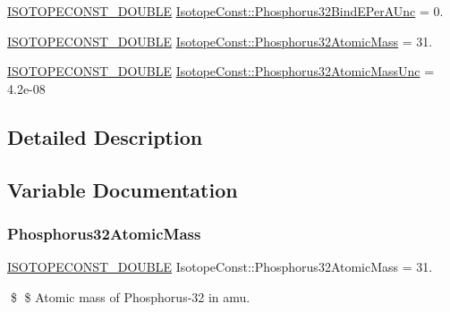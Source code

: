\begin{DoxyCompactItemize}
\mbox{\hyperlink{group___isotope_const-_macros_ga8f45a7272ce02c0b4c65c44636ed719a}{I\+S\+O\+T\+O\+P\+E\+C\+O\+N\+S\+T\+\_\+\+D\+O\+U\+B\+LE}} \mbox{\hyperlink{group___isotope_const-_phosphorus-_p32_ga9a51d8db309dab392c40f577ca3515db}{Isotope\+Const\+::\+Phosphorus32\+Bind\+E\+Per\+A\+Unc}} = 0.
\item 
\mbox{\hyperlink{group___isotope_const-_macros_ga8f45a7272ce02c0b4c65c44636ed719a}{I\+S\+O\+T\+O\+P\+E\+C\+O\+N\+S\+T\+\_\+\+D\+O\+U\+B\+LE}} \mbox{\hyperlink{group___isotope_const-_phosphorus-_p32_gad278abb1a4537dd09f5342ee612f6771}{Isotope\+Const\+::\+Phosphorus32\+Atomic\+Mass}} = 31.
\item 
\mbox{\hyperlink{group___isotope_const-_macros_ga8f45a7272ce02c0b4c65c44636ed719a}{I\+S\+O\+T\+O\+P\+E\+C\+O\+N\+S\+T\+\_\+\+D\+O\+U\+B\+LE}} \mbox{\hyperlink{group___isotope_const-_phosphorus-_p32_gab9491f18399ec131de188623e328b40e}{Isotope\+Const\+::\+Phosphorus32\+Atomic\+Mass\+Unc}} = 4.\+2e-\/08
\end{DoxyCompactItemize}


\subsection{Detailed Description}


\subsection{Variable Documentation}
\mbox{\label{group___isotope_const-_phosphorus-_p32_gad278abb1a4537dd09f5342ee612f6771}} 
\subsubsection{\texorpdfstring{Phosphorus32\+Atomic\+Mass}{Phosphorus32AtomicMass}}
{\footnotesize\ttfamily \mbox{\hyperlink{group___isotope_const-_macros_ga8f45a7272ce02c0b4c65c44636ed719a}{I\+S\+O\+T\+O\+P\+E\+C\+O\+N\+S\+T\+\_\+\+D\+O\+U\+B\+LE}} Isotope\+Const\+::\+Phosphorus32\+Atomic\+Mass = 31.}

\$ \$ Atomic mass of Phosphorus-\/32 in amu. \mbox{\label{group___isotope_const-_phosphorus-_p32_gab9491f18399ec131de188623e328b40e}} 

